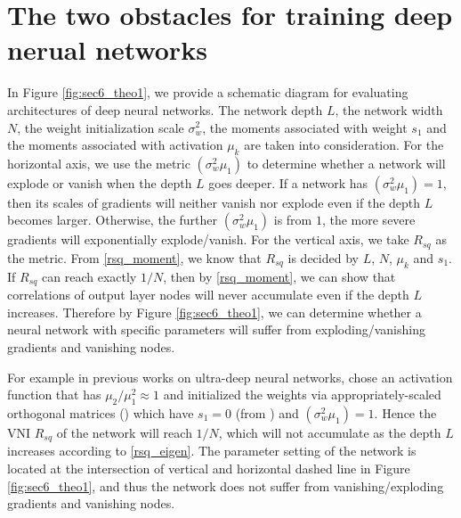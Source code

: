 \section{The two obstacles for training deep nerual networks} \label{comp:obstacles}


In Figure \ref{fig:sec6_theo1}, we provide a schematic diagram for evaluating architectures
of deep neural networks. The network depth $L$, the network width $N$, the weight initialization scale
$\sigma_w^2$, the moments associated with weight $s_1$ and the moments associated with activation
$\mu_k$ are taken into consideration. For the horizontal axis, we use the metric $(\sigma_w^2\mu_1)$
to determine whether a network will explode or vanish when the depth $L$ goes deeper. If a network has
$(\sigma_w^2\mu_1)=1$, then its scales of gradients will neither vanish nor explode even if the depth
$L$ becomes larger. Otherwise, the further $(\sigma_w^2\mu_1)$ is from $1$, the more severe gradients
will exponentially explode/vanish. For the vertical axis, we take $R_{sq}$ as the metric. From
\eqref{rsq_moment}, we know that $R_{sq}$ is decided by $L$, $N$, $\mu_k$ and $s_1$. If $R_{sq}$ can
reach exactly $1/N$, then by \eqref{rsq_moment}, we can show  that correlations of output layer nodes
will never accumulate even if the depth $L$ increases. Therefore by Figure \ref{fig:sec6_theo1}, we can
determine whether a neural network with specific parameters will suffer from exploding/vanishing
gradients and vanishing nodes.

For example in previous works on ultra-deep neural networks, \cite{mft:cnn} chose an activation
function that has $\mu_2/\mu_1^2\approx1$ and initialized the weights via appropriately-scaled
orthogonal matrices (\cite{mft:linear}) which have $s_1=0$ (from \cite{mft:sigmoid}) and
$(\sigma_w^2\mu_1)=1$. Hence the VNI $R_{sq}$ of the network will reach $1/N$, which will not
accumulate as the depth $L$ increases according to \eqref{rsq_eigen}. The parameter setting of the
network is located at the intersection of vertical and horizontal dashed line in Figure
\ref{fig:sec6_theo1}, and thus the network does not suffer from vanishing/exploding gradients
and vanishing nodes.

